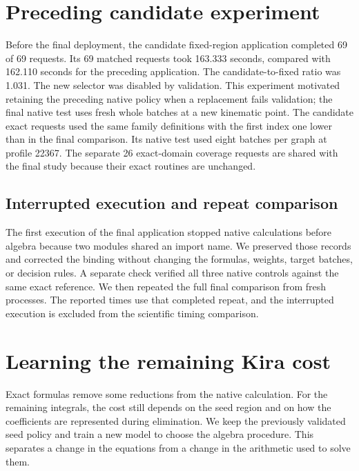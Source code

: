 \documentclass[11pt,a4paper]{article}
\begin{document}
\section{Preceding candidate experiment}
Before the final deployment, the candidate fixed-region application completed 69 of 69 requests. Its 69 matched requests took 163.333 seconds, compared with 162.110 seconds for the preceding application. The candidate-to-fixed ratio was 1.031. The new selector was disabled by validation. This experiment motivated retaining the preceding native policy when a replacement fails validation; the final native test uses fresh whole batches at a new kinematic point. The candidate exact requests used the same family definitions with the first index one lower than in the final comparison. Its native test used eight batches per graph at profile 22367. The separate 26 exact-domain coverage requests are shared with the final study because their exact routines are unchanged.

\subsection{Interrupted execution and repeat comparison}
The first execution of the final application stopped native calculations before algebra because two modules shared an import name. We preserved those records and corrected the binding without changing the formulas, weights, target batches, or decision rules. A separate check verified all three native controls against the same exact reference. We then repeated the full final comparison from fresh processes. The reported times use that completed repeat, and the interrupted execution is excluded from the scientific timing comparison.

\section{Learning the remaining Kira cost}
\label{notes-reconstruction-sec:learning}
Exact formulas remove some reductions from the native calculation. For the remaining integrals, the cost still depends on the seed region and on how the coefficients are represented during elimination. We keep the previously validated seed policy and train a new model to choose the algebra procedure. This separates a change in the equations from a change in the arithmetic used to solve them.
\end{document}
